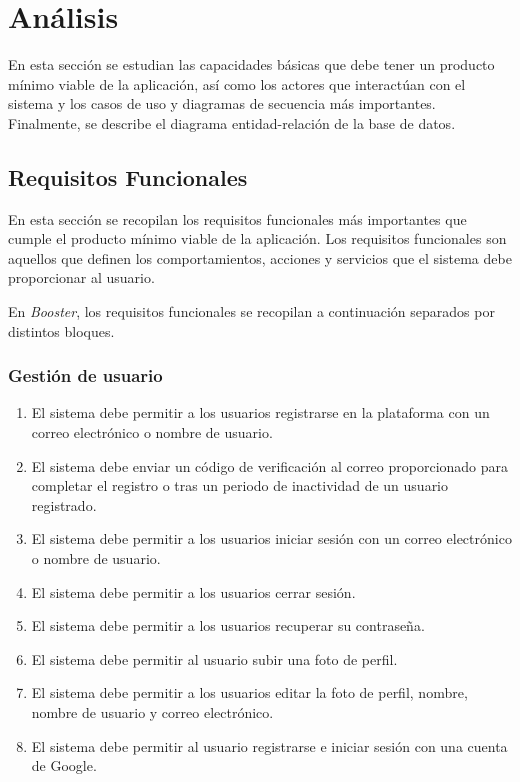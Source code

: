 \chapter{Análisis}

En esta sección se estudian las capacidades básicas que debe tener un producto mínimo viable de la aplicación, así como los actores que interactúan con el sistema y los casos de uso y diagramas de secuencia más importantes. Finalmente, se describe el diagrama entidad-relación de la base de datos.

\section{Requisitos Funcionales}

En esta sección se recopilan los requisitos funcionales más importantes que cumple el producto mínimo viable de la aplicación. Los requisitos funcionales son aquellos que definen los comportamientos, acciones y servicios que el sistema debe proporcionar al usuario. 

En \textit{Booster}, los requisitos funcionales se recopilan a continuación separados por distintos bloques.

\subsection{Gestión de usuario}

\begin{enumerate}[label=\textbf{RF-GU \arabic*.}, leftmargin=*]
    \item El sistema debe permitir a los usuarios registrarse en la plataforma con un correo electrónico o nombre de usuario.
    \item El sistema debe enviar un código de verificación al correo proporcionado para completar el registro o tras un periodo de inactividad de un usuario registrado.
    \item El sistema debe permitir a los usuarios iniciar sesión con un correo electrónico o nombre de usuario.
    \item El sistema debe permitir a los usuarios cerrar sesión.
    \item El sistema debe permitir a los usuarios recuperar su contraseña.
    \item El sistema debe permitir al usuario subir una foto de perfil. 
    \item El sistema debe permitir a los usuarios editar la foto de perfil, nombre, nombre de usuario y correo electrónico.
    \item El sistema debe permitir al usuario registrarse e iniciar sesión con una cuenta de Google.

\end{enumerate}

